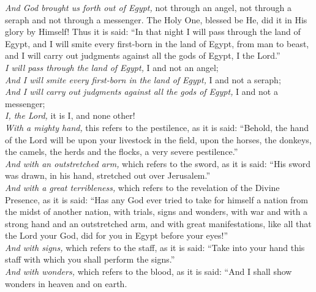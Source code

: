 \documentclass[letter,11pt,openany]{memoir}
\newcommand{\HgEllipsis}{\ensuremath{\left[\ldots\right]}}
\newcommand{\HgFill}{\vfill \hrule \vfill}
\newenvironment{HgEnglish}{\strut\\\noindent}{\vspace{1em}}
\begin{document}
\vspace{-1em}
{\small
\noindent
{\itshape And God brought us forth out of Egypt,} not through an angel, not through a seraph
and not through a messenger. The Holy One, blessed be He, did it in His glory by
Himself! Thus it is said: ``In that night I will pass through the land of Egypt, and I
will smite every first-born in the land of Egypt, from man to beast, and I will
carry out judgments against all the gods of Egypt, I the Lord.''\\[.5em]
  \phantom{MM} {\itshape I will pass through the land of Egypt,} I and not an
  angel;\\[.4em]
  \phantom{MM} {\itshape And I will smite every first-born in the land of Egypt,} I and not
  a seraph;\\[.4em]
  \phantom{MM} {\itshape And I will carry out judgments against all the gods of Egypt,} I and not a
  messenger;\\[.4em]
  \phantom{MM} {\itshape I, the Lord,} it is I, and none other!\\[1em]
{\itshape With a mighty hand,} this refers to the pestilence, as it is said:
``Behold, the hand of the Lord will be upon your livestock in the field, upon
the horses, the donkeys, the camels, the herds and the flocks, a very severe
pestilence.'' \\[1em]
{\itshape And with an outstretched arm,} which refers to the sword, as it is said: ``His
sword was drawn, in his hand, stretched out over Jerusalem.'' \\[1em]
{\itshape And with a great terribleness,} which refers to the revelation of the Divine
Presence, as it is said: ``Has any God ever tried to take for himself a nation
from the midst of another nation, with trials, signs and wonders, with war and
with a strong hand and an outstretched arm, and with great manifestations, like
all that the Lord your God, did for you in Egypt before your eyes!'' \\[1em]
{\itshape And with signs,} which refers to the staff, as it is said: ``Take into your
hand this staff with which you shall perform the signs.'' \\[1em]
{\itshape And with wonders,} which refers to the blood, as it is said: ``And I
shall show wonders in heaven and on earth.}


%
%
\end{document}
